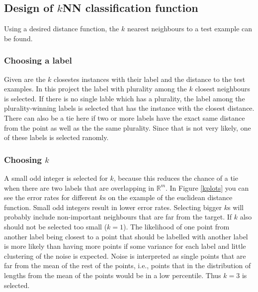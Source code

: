 \documentclass[10pt,twocolumn,letterpaper]{article}
\begin{document}
\subsection{Design of $k$NN classification function}
\label{kNN}
Using a desired distance function, the $k$ nearest neighbours to a test example can be found.

\subsubsection*{Choosing a label}
Given are the $k$ closestes instances with their label and the distance to the test examples.
In this project the label with plurality among the $k$ closest neighbours is selected. If there is no single lable which has a plurality, the label among the plurality-winning labels is selected that has the instance with the closest distance. There can also be a tie here if two or more labels have the exact same distance from the point as well as the the same plurality. Since that is not very likely, one of these labels is selected ranomly.  
\subsubsection*{Choosing $k$}

A small odd integer is selected for $k$, because this reduces the chance of a tie when there are two labels that are overlapping in $\mathbb{R}^m$.
In Figure \ref{kplots} you can see the error rates for different $k$s on the example of the euclidean distance function. Small odd integers result in lower error rates. Selecting bigger $k$s will probably include non-important neighbours that are far from the target.
If $k$ also should not be selected too small ($k=1$). The likelihood of one point from another label being closest to a point that should be labelled with another label is more likely than having more points if some variance for each label and little clustering of the noise is expected. Noise is interpreted as single points that are far from the mean of the rest of the points, i.e., points that in the distribution of lengths from the mean of the points would be in a low percentile. Thus $k=3$ is selected. 
\end{document}
